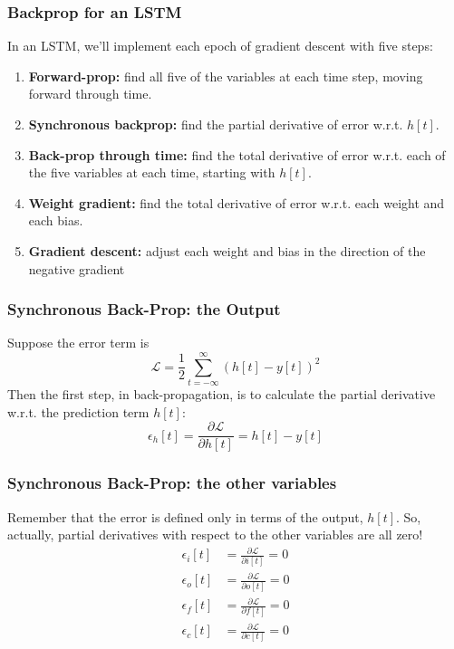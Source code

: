 \documentclass{beamer}
\begin{document}
\begin{frame}
  \frametitle{Backprop for an LSTM}
  In an LSTM, we'll implement each epoch of gradient descent with five steps:
  \begin{enumerate}
    \item {\bf Forward-prop:} find all five of the variables at each time step,
      moving forward through time.
    \item {\bf Synchronous backprop:} find the partial derivative of
      error w.r.t. $h[t]$.  
    \item {\bf Back-prop through time:} find the total derivative of
      error w.r.t. each of the five variables at each time, starting with $h[t]$.
    \item {\bf Weight gradient:} find the total derivative of error
      w.r.t. each weight and each bias.
    \item {\bf Gradient descent:} adjust each weight and bias in the direction
      of the negative gradient
  \end{enumerate}
\end{frame}

  
\begin{frame}
  \frametitle{Synchronous Back-Prop: the Output}
  Suppose the error term is
  \[
  {\mathcal L} = \frac{1}{2}\sum_{t=-\infty}^\infty \left(h[t]-y[t]\right)^2
  \]
  Then the first step, in back-propagation, is to calculate the
  partial derivative w.r.t. the prediction term $h[t]$:
  \[
  \epsilon_h[t] = \frac{\partial {\mathcal L}}{\partial h[t]} = h[t]-y[t]
  \]
\end{frame}

\begin{frame}
  \frametitle{Synchronous Back-Prop: the other variables}

  Remember that the error is defined only in terms of the output,
  $h[t]$.  So, actually, partial derivatives with respect to the other
  variables are all zero!
  \begin{align*}
    \epsilon_i[t] &=\frac{\partial {\mathcal L}}{\partial i[t]} = 0\\
    \epsilon_o[t] &=\frac{\partial {\mathcal L}}{\partial o[t]} = 0\\
    \epsilon_f[t] &=\frac{\partial {\mathcal L}}{\partial f[t]} = 0\\
    \epsilon_c[t] &=\frac{\partial {\mathcal L}}{\partial c[t]} = 0\\
  \end{align*}
\end{frame}
\end{document}
